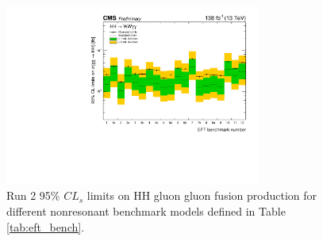 \begin{figure}[!htbp]
\centering
\includegraphics[width=0.75\textwidth]{Images/Results/EFT_CombinedUpperlimits.pdf}
\caption{Run 2 95\% $CL_{s}$ limits on HH gluon gluon fusion production for different nonresonant benchmark models defined in Table \ref{tab:eft_bench}.}
\label{fig:20_EFT_benchmark_results_all}
\end{figure}
